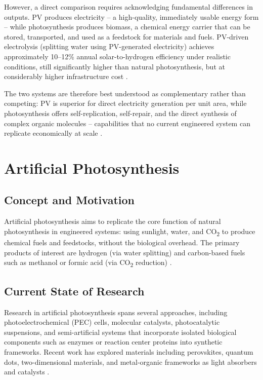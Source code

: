\documentclass[conference]{IEEEtran}
\begin{document}
However, a direct comparison requires acknowledging fundamental differences in outputs. PV produces electricity -- a high-quality, immediately usable energy form -- while photosynthesis produces biomass, a chemical energy carrier that can be stored, transported, and used as a feedstock for materials and fuels. PV-driven electrolysis (splitting water using PV-generated electricity) achieves approximately 10--12\% annual solar-to-hydrogen efficiency under realistic conditions, still significantly higher than natural photosynthesis, but at considerably higher infrastructure cost \cite{ars_usda_news, ars_usda_mag}.

The two systems are therefore best understood as complementary rather than competing: PV is superior for direct electricity generation per unit area, while photosynthesis offers self-replication, self-repair, and the direct synthesis of complex organic molecules -- capabilities that no current engineered system can replicate economically at scale \cite{pubmed_comparison}.

\section{Artificial Photosynthesis}

\subsection{Concept and Motivation}
Artificial photosynthesis aims to replicate the core function of natural photosynthesis in engineered systems: using sunlight, water, and CO\textsubscript{2} to produce chemical fuels and feedstocks, without the biological overhead. The primary products of interest are hydrogen (via water splitting) and carbon-based fuels such as methanol or formic acid (via CO\textsubscript{2} reduction) \cite{satw_outlook, pmc_artificial}.

\subsection{Current State of Research}
Research in artificial photosynthesis spans several approaches, including photoelectrochemical (PEC) cells, molecular catalysts, photocatalytic suspensions, and semi-artificial systems that incorporate isolated biological components such as enzymes or reaction center proteins into synthetic frameworks. Recent work has explored materials including perovskites, quantum dots, two-dimensional materials, and metal-organic frameworks as light absorbers and catalysts \cite{sciencedirect_topic, altenergy_mag}.
\end{document}
